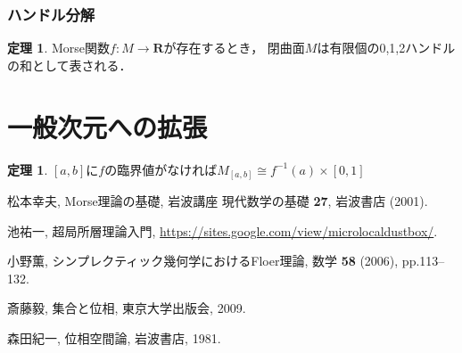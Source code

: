 \documentclass[11pt, a4paper, dvipdfmx]{jsarticle}
\theoremstyle{definition}
\newcommand{\rr}{\mathbf{R}}
\theoremstyle{mystyle}
\newtheorem{THM}[Axiom]{定理}
\numberwithin{equation}{section} %
\begin{document}
\subsubsection{ハンドル分解}

\begin{THM}
    Morse関数$f\colon M\to\rr$が存在するとき，
    閉曲面$M$は有限個の0,1,2ハンドルの和として表される．
\end{THM}
\section{一般次元への拡張}

\begin{THM}\label{thm:crit-diff}
    $[a,b]$に$f$の臨界値がなければ$M_{[a,b]}\cong f^{-1}(a)\times[0,1]$
\end{THM}




\begin{thebibliography}{15}

 松本幸夫, Morse理論の基礎, 岩波講座 現代数学の基礎 {\bf 27}, 岩波書店 (2001). 

 池祐一, 超局所層理論入門, \url{https://sites.google.com/view/microlocaldustbox/}. 

 小野薫, シンプレクティック幾何学におけるFloer理論, 数学 \textbf{58} (2006), pp.113--132.

 斎藤毅, 集合と位相, 東京大学出版会, 2009. 

 森田紀一, 位相空間論, 岩波書店, 1981. 

\end{thebibliography}
\end{document}
